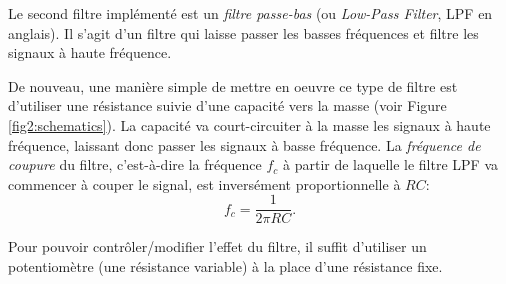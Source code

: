 Le second filtre implémenté est un \emph{filtre passe-bas} (ou \emph{Low-Pass Filter}, LPF en anglais). Il s'agit d'un filtre qui laisse passer les basses fréquences et filtre les signaux à haute fréquence. 

De nouveau, une manière simple de mettre en oeuvre ce type de filtre est d'utiliser une résistance suivie d'une capacité vers la masse (voir Figure \ref{fig2:schematics}). La capacité va court-circuiter à la masse les signaux à haute fréquence, laissant donc passer les signaux à basse fréquence. La \emph{fréquence de coupure} du filtre, c'est-à-dire la fréquence $f_c$ à partir de laquelle le filtre LPF va commencer à couper le signal, est inversément proportionnelle à $RC$:
\[
	f_c = \dfrac{1}{2\pi RC}.
\]

Pour pouvoir contrôler/modifier l'effet du filtre, il suffit d'utiliser un potentiomètre (une résistance variable) à la place d'une résistance fixe.